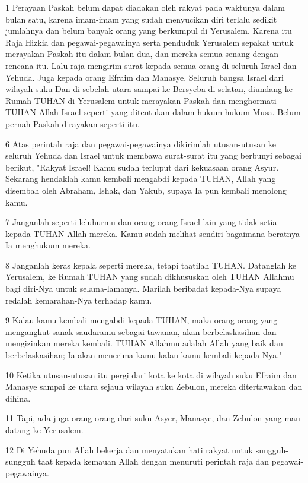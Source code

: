 \par 1 Perayaan Paskah belum dapat diadakan oleh rakyat pada waktunya dalam bulan satu, karena imam-imam yang sudah menyucikan diri terlalu sedikit jumlahnya dan belum banyak orang yang berkumpul di Yerusalem. Karena itu Raja Hizkia dan pegawai-pegawainya serta penduduk Yerusalem sepakat untuk merayakan Paskah itu dalam bulan dua, dan mereka semua senang dengan rencana itu. Lalu raja mengirim surat kepada semua orang di seluruh Israel dan Yehuda. Juga kepada orang Efraim dan Manasye. Seluruh bangsa Israel dari wilayah suku Dan di sebelah utara sampai ke Bersyeba di selatan, diundang ke Rumah TUHAN di Yerusalem untuk merayakan Paskah dan menghormati TUHAN Allah Israel seperti yang ditentukan dalam hukum-hukum Musa. Belum pernah Paskah dirayakan seperti itu.
\par 6 Atas perintah raja dan pegawai-pegawainya dikirimlah utusan-utusan ke seluruh Yehuda dan Israel untuk membawa surat-surat itu yang berbunyi sebagai berikut, "Rakyat Israel! Kamu sudah terluput dari kekuasaan orang Asyur. Sekarang hendaklah kamu kembali mengabdi kepada TUHAN, Allah yang disembah oleh Abraham, Ishak, dan Yakub, supaya Ia pun kembali menolong kamu.
\par 7 Janganlah seperti leluhurmu dan orang-orang Israel lain yang tidak setia kepada TUHAN Allah mereka. Kamu sudah melihat sendiri bagaimana beratnya Ia menghukum mereka.
\par 8 Janganlah keras kepala seperti mereka, tetapi taatilah TUHAN. Datanglah ke Yerusalem, ke Rumah TUHAN yang sudah dikhususkan oleh TUHAN Allahmu bagi diri-Nya untuk selama-lamanya. Marilah beribadat kepada-Nya supaya redalah kemarahan-Nya terhadap kamu.
\par 9 Kalau kamu kembali mengabdi kepada TUHAN, maka orang-orang yang mengangkut sanak saudaramu sebagai tawanan, akan berbelaskasihan dan mengizinkan mereka kembali. TUHAN Allahmu adalah Allah yang baik dan berbelaskasihan; Ia akan menerima kamu kalau kamu kembali kepada-Nya."
\par 10 Ketika utusan-utusan itu pergi dari kota ke kota di wilayah suku Efraim dan Manasye sampai ke utara sejauh wilayah suku Zebulon, mereka ditertawakan dan dihina.
\par 11 Tapi, ada juga orang-orang dari suku Asyer, Manasye, dan Zebulon yang mau datang ke Yerusalem.
\par 12 Di Yehuda pun Allah bekerja dan menyatukan hati rakyat untuk sungguh-sungguh taat kepada kemauan Allah dengan menuruti perintah raja dan pegawai-pegawainya.
